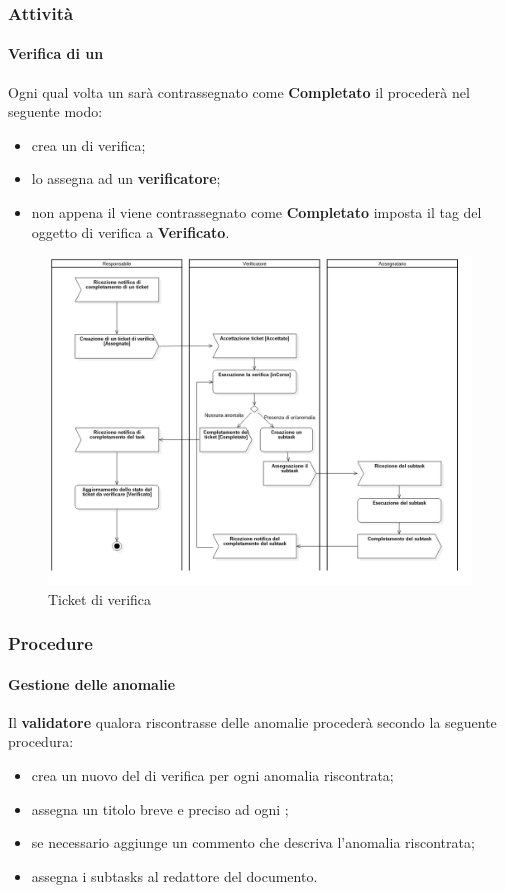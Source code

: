 \subsubsection{Attività}
	\paragraph{Verifica di un }
	Ogni qual volta un  sarà contrassegnato come \textbf{Completato} il \RES {} procederà nel seguente modo: 
	\begin{itemize}
		\item crea un  di verifica;
		\item lo assegna ad un \textbf{verificatore};
		\item non appena il  viene contrassegnato come \textbf{Completato} imposta il tag del  oggetto di verifica a \textbf{Verificato}.
	\end{itemize}
	\begin{figure}
		\centering
		\includegraphics[scale=0.40]{img/ticketVerifica.png}
		\caption{Ticket di verifica}
	\end{figure}
\subsubsection{Procedure}
	\paragraph{Gestione delle anomalie}
			Il \textbf{validatore} qualora riscontrasse delle anomalie procederà secondo la seguente procedura:
			\begin{itemize}
				\item crea un nuovo  del  di verifica per ogni anomalia riscontrata;
				\item assegna un titolo breve e preciso ad ogni ;
				\item se necessario aggiunge un commento che descriva l'anomalia riscontrata;
				\item assegna i subtasks al redattore del documento.
			\end{itemize}